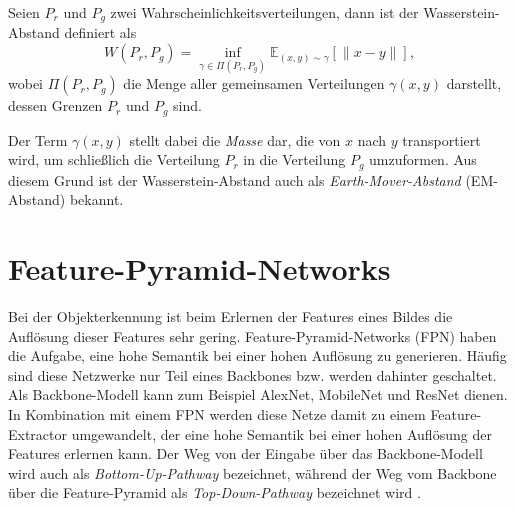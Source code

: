 \begin{definition}
Seien $P_r$ und $P_g$ zwei Wahrscheinlichkeitsverteilungen, dann ist der
Wasserstein-Abstand definiert als
\[
    W(P_r, P_g) = \inf_{\gamma \in \Pi(P_r, P_g)} \mathbb{E}_{(x, y) \sim \gamma} \left[\|x - y\|\right],
\]
wobei $\Pi(P_r, P_g)$ die Menge aller gemeinsamen Verteilungen $\gamma(x,
y)$ darstellt, dessen Grenzen $P_r$ und $P_g$ sind.
\end{definition}

Der Term $\gamma(x, y)$ stellt dabei die \textit{Masse} dar, die von $x$ nach
$y$ transportiert wird, um schließlich die Verteilung $P_r$ in die Verteilung
$P_g$ umzuformen. Aus diesem Grund ist der Wasserstein-Abstand auch als
\textit{Earth-Mover-Abstand} (EM-Abstand) bekannt.

\section{Feature-Pyramid-Networks}
Bei der Objekterkennung ist beim Erlernen der Features eines Bildes die
Auflösung dieser Features sehr gering. Feature-Pyramid-Networks (FPN) haben die
Aufgabe, eine hohe Semantik bei einer hohen Auflösung zu generieren. Häufig sind
diese Netzwerke nur Teil eines Backbones bzw. werden dahinter geschaltet. Als
Backbone-Modell kann zum Beispiel AlexNet, MobileNet und ResNet dienen. In
Kombination mit einem FPN werden diese Netze damit zu einem Feature-Extractor
umgewandelt, der eine hohe Semantik bei einer hohen Auflösung der Features
erlernen kann. Der Weg von der Eingabe über das Backbone-Modell wird auch als
\textit{Bottom-Up-Pathway} bezeichnet, während der Weg vom Backbone über die
Feature-Pyramid als \textit{Top-Down-Pathway} bezeichnet wird
\cite{lin2017feature}.


